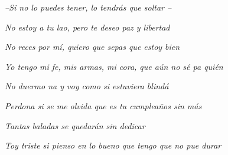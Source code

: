 %
%
%
%
%
%
%
%
%
%
%
%


\ifpdf
\fi

\thispagestyle{empty}\mbox{}



\vspace*{4cm}

\small





\hfill \emph{--Si no lo puedes tener, lo tendrás que soltar --}

\hfill \emph{No estoy a tu lao, pero te deseo paz y libertad }

\hfill \emph{No reces por mí, quiero que sepas que estoy bien}

\hfill \emph{Yo tengo mi fe, mis armas, mi cora, que aún no sé pa quién}

\hfill 

\hfill \emph{No duermo na y voy como si estuviera blindá} 

\hfill \emph{Perdona si se me olvida que es tu cumpleaños sin más}

\hfill \emph{Tantas baladas se quedarán sin dedicar}

\hfill \emph{Toy triste si pienso en lo bueno que tengo que no pue durar}

\vfill%


\newpage
\thispagestyle{empty}\mbox{}

\newpage


